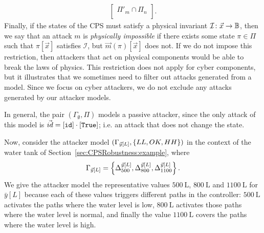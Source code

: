 {{\begin{definition}[Attack]
\begin{align}
\begin{bmatrix}
    \Pi'_{m}\cap\Pi_{n}\\
  \end{bmatrix}.
\end{align} 
Finally, if the states of the CPS must satisfy a physical invariant $\mathcal{I}\colon \vec{x}\rightarrow{\mathbb{B}}$, then we say that an attack $m$ is \emph{physically impossible} if there exists some state $\pi\in \Pi$ such that $\pi[\vec{x}]$ satisfies $\mathcal{I}$, but $\vec{m}(\pi)[\vec{x}]$ does not. If we do not impose this restriction, then attackers that act on physical components would be able to break the laws of physics. This restriction does not apply for cyber components, but it illustrates that we sometimes need to filter out attacks generated from a model. %
Since we focus on cyber attackers, we do not exclude any attacks generated by our attacker models. %
\end{definition}
\begin{example}
  \label{ex:CPSRobustness:attack}
  In general, the pair $(\Gamma_{\emptyset}, \Pi)$ models a passive attacker, since the only attack of this model is $\vec{id}=[{\texttt{id}}]\cdot[\texttt{True}]$; i.e. an attack that does not change the state. %

  Now, consider the attacker model $(\Gamma_{\vec{y}[L]},\left\{LL,OK,HH\right\})$ in the context of the water tank of Section~\ref{sec:CPSRobustness:example}, where
  \begin{align}
    \Gamma_{\vec{y}[L]}=\left\{{\Delta}^{\vec{y}[L]}_{500}, {\Delta}^{\vec{y}[L]}_{800},  {\Delta}^{\vec{y}[L]}_{1100}\right\}.
  \end{align}
  We give the attacker model the {representative values} $500~\mathrm{L}$, $800~\mathrm{L}$ and $1100~\mathrm{L}$ for $\bar{y}[L]$ because each of these values triggers different paths in the controller: $500~\mathrm{L}$ activates the paths where the water level is low, $800~\mathrm{L}$ activates those paths where the water level is normal, and finally the value $1100~\mathrm{L}$ covers the paths where the water level is high.


\end{example}}}
